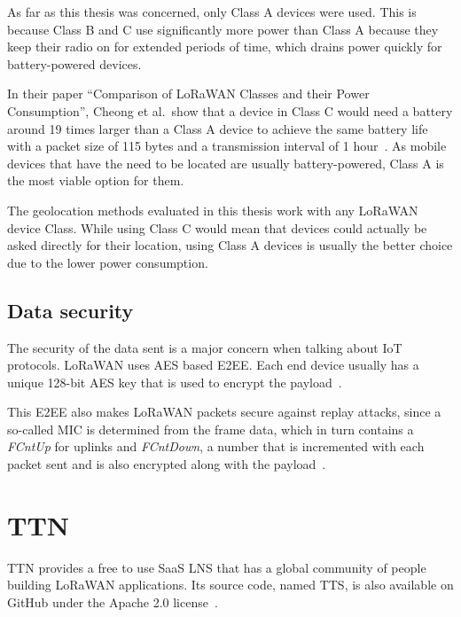 As far as this thesis was concerned, only Class A devices were used.
This is because Class B and C use significantly more power than Class A because they keep their radio on for extended periods of time, which drains power quickly for battery-powered devices.

In their paper ``Comparison of LoRaWAN Classes and their Power Consumption'', Cheong et al.\ show that a device in Class C would need a battery around 19 times larger than a Class A device to achieve the same battery life with a packet size of 115 bytes and a transmission interval of 1 hour~\cite{cheong_comparison_2017}.
As mobile devices that have the need to be located are usually battery-powered, Class A is the most viable option for them.

The geolocation methods evaluated in this thesis work with any \ac{LoRaWAN} device Class.
While using Class C would mean that devices could actually be asked directly for their location, using Class A devices is usually the better choice due to the lower power consumption.

\subsection{Data security}

The security of the data sent is a major concern when talking about \ac{IoT} protocols.
\ac{LoRaWAN} uses \ac{AES} based \acf{E2EE}.
Each end device usually has a unique 128-bit \ac{AES} key that is used to encrypt the payload~\cite[p. 24]{lora_alliance_inc_lorawan_specification_2017}.

This \ac{E2EE} also makes \ac{LoRaWAN} packets secure against replay attacks, since a so-called \ac{MIC} is determined from the frame data, which in turn contains a \emph{FCntUp} for uplinks and \emph{FCntDown}, a number that is incremented with each packet sent and is also encrypted along with the payload~\cite[p. 22f.]{lora_alliance_inc_lorawan_specification_2017}.

\section{\acf{TTN}}

\ac{TTN} provides a free to use \ac{SaaS} \ac{LNS} that has a global community of people building \ac{LoRaWAN} applications.
Its source code, named \ac{TTS}, is also available on GitHub under the Apache 2.0 license~\cite{the_things_network_thethingsnetworklorawan-stack_2023}.

